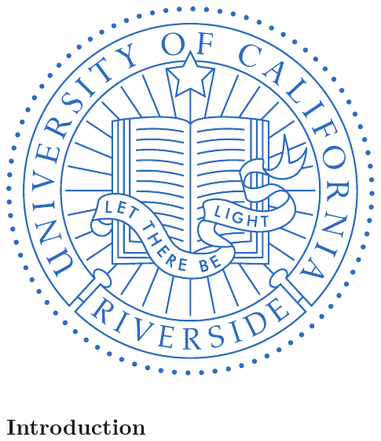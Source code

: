 \documentclass[12pt]{article}
\begin{document}
\begin{titlepage}
		\newcommand*{\plogo}{\includegraphics{Code/Fig/UC_Riverside_seal.pdf}}
		
		\plogo\\[1cm] %
		
		
		\vfill %
	\end{titlepage}
	
	\newpage
	
	\tableofcontents
	\pagebreak
	\listoffigures
	\lstlistoflistings  
	\pagebreak
	
	
	\section{Introduction}
	
\end{document}
